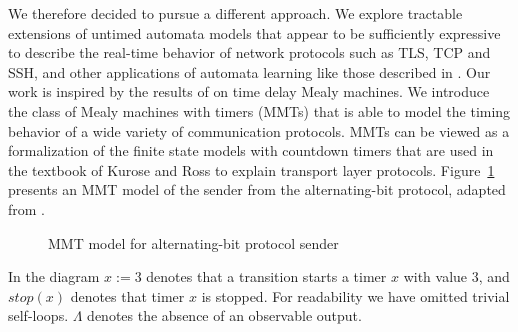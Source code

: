 We therefore decided to pursue a different approach. We explore tractable extensions of untimed automata models that appear to
be sufficiently expressive to describe the real-time behavior of network protocols such as TLS, TCP and SSH, and other
applications of automata learning like those described in \cite{Vaa17}.
%
Our work is inspired by the results of \cite{CCF16} on time delay Mealy machines.
We introduce the class of Mealy machines with timers (MMTs) that 
is able to model the timing behavior of a wide variety of communication protocols.
MMTs can be viewed as a formalization of the finite state models with countdown timers that are used in the textbook of
Kurose and Ross \cite{KR13} to explain transport layer protocols.
Figure~\ref{fig:abp} presents an MMT model of the sender from 
the alternating-bit protocol, adapted from \cite[Figure 3.15]{KR13}.
\begin{figure}[h]
\centering
\ifshort
\vspace{-2 em}
\fi
{}
\caption{MMT model for alternating-bit protocol sender}
\label{fig:abp}
\end{figure}
In the diagram $x :=3$ denotes that a transition starts a timer $x$ with value $3$,
and $\mathit{stop}(x)$ denotes that timer $x$ is stopped.
For readability we have omitted trivial self-loops.
\iflong
$\Lambda$ denotes the absence of an observable output. 

